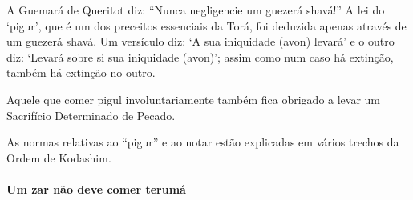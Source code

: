 \begin{multicols}{2}
A Guemará\starr{} de Queritot\starr{} diz: ``Nunca negligencie um guezerá shavá\starr!'' A
lei do `pigur', que é um dos preceitos essenciais da Torá\starr, foi deduzida
apenas através de um guezerá shavá\starr. Um versículo diz: `A sua
iniquidade (avon\starr) levará' e o outro diz: `Levará sobre si sua iniquidade
(avon\starr)'; assim como num caso há extinção, também há extinção no outro.

Aquele que comer pigul\starr{} involuntariamente também fica obrigado a
levar um Sacrifício Determinado de Pecado.

As normas relativas ao ``pigur'' e ao notar\starr{} estão explicadas em
vários trechos da Ordem de Kodashim\starr.

\paragraph{Um zar\starr{} não deve comer terumá\starr}


\end{multicols}
